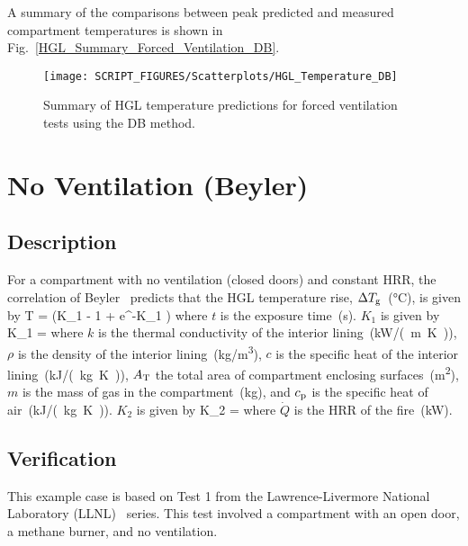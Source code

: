 A summary of the comparisons between peak predicted and measured compartment temperatures is shown in Fig.~\ref{HGL_Summary_Forced_Ventilation_DB}.

\begin{figure}[!ht]
\begin{center}
\texttt{[image: SCRIPT\_FIGURES/Scatterplots/HGL\_Temperature\_DB]}
\end{center}
\caption[Summary of HGL temperature predictions for forced ventilation tests (DB)]
{Summary of HGL temperature predictions for forced ventilation tests using the DB method.}
\label{HGL Temperature, Forced Ventilation (DB)}
\end{figure}


\clearpage


\section{No Ventilation (Beyler)}
\label{sec:Beyler}

\subsection*{Description}

For a compartment with no ventilation (closed doors) and constant HRR, the correlation of Beyler~\cite{SFPE:Walton} predicts that the HGL temperature rise, $\Delta T\sb{g}$~(\si{\celsius}), is given by
\be
\Delta T =  (K_1  - 1 + e^{-K_1 })
\label{eq:Beyler}
\ee
where $t$ is the exposure time~(\si{\second}). $K_1$ is given by
\be
K_1 = 
\label{eq:Beyler_K1}
\ee
where $k$ is the thermal conductivity of the interior lining~(\si{kW/(m.K)}), $\rho$ is the density of the interior lining~(\si{kg/m^3}), $c$ is the specific heat of the interior lining~(\si{kJ/(kg.K)}), $A\sb{T}$ the total area of compartment enclosing surfaces~(\si{m^2}), $m$ is the mass of gas in the compartment~(\si{kg}), and $c\sb{p}$ is the specific heat of air~(\si{kJ/(kg.K)}). $K_2$ is given by
\be
K_2 = 
\label{eq:Beyler_K2}
\ee
where $\dot Q$ is the HRR of the fire~(\si{kW}).


\clearpage


\subsection*{Verification}

This example case is based on Test 1 from the Lawrence-Livermore National Laboratory (LLNL)~\cite{Foote:LLNL1986} series. This test involved a compartment with an open door, a methane burner, and no ventilation.

